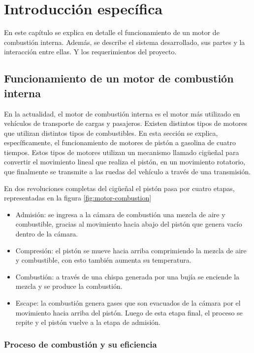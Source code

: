 \chapter{Introducción específica} %

\label{Chapter2}

En este capítulo se explica en detalle el funcionamiento de un motor de combustión interna. Además, se describe el sistema desarrollado, sus partes y la interacción entre ellas. Y los requerimientos del proyecto.

\section{Funcionamiento de un motor de combustión interna} \label{func-motor}

En la actualidad, el motor de combustión interna es el motor más utilizado en vehículos de transporte de cargas y pasajeros. Existen distintos tipos de motores que utilizan distintos tipos de combustibles. En esta sección se explica, específicamente, el funcionamiento de motores de pistón a gasolina de cuatro tiempos. Estos tipos de motores utilizan un mecanismo llamado cigüeñal para convertir el movimiento lineal que realiza el pistón, en un movimiento rotatorio, que finalmente se transmite a las ruedas del vehículo a través de una transmisión.

En dos revoluciones completas del cigüeñal el pistón pasa por cuatro etapas, representadas en la figura \ref{fig:motor-combustion}
\begin{itemize}
\item{Admisión:} se ingresa a la cámara de combustión una mezcla de aire y combustible, gracias al movimiento hacia abajo del pistón que genera vacío dentro de la cámara.
\item{Compresión:} el pistón se mueve hacia arriba comprimiendo la mezcla de aire y combustible, con esto también aumenta su temperatura.
\item{Combustión:} a través de una chispa generada por una bujía se enciende la mezcla y se produce la combustión.
\item{Escape:} la combustión genera gases que son evacuados de la cámara por el movimiento hacia arriba del pistón. Luego de esta etapa final, el proceso se repite y el pistón vuelve a la etapa de admisión.
\end{itemize}

\subsection{Proceso de combustión y su eficiencia}

